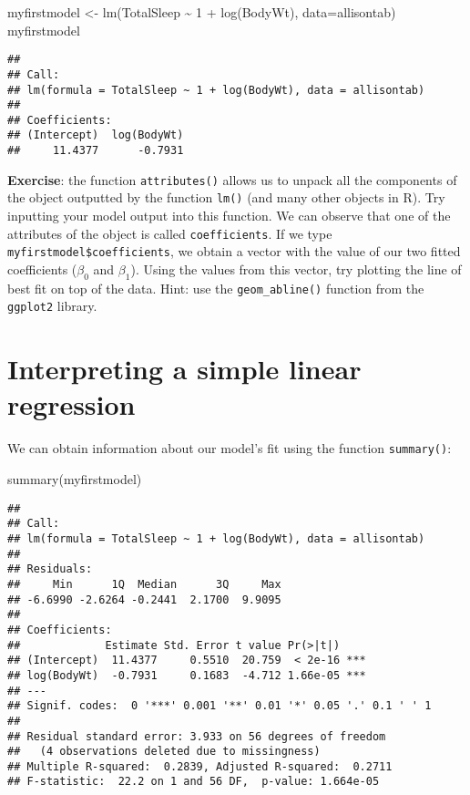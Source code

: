 \documentclass[
]{book}
\newenvironment{Shaded}{\begin{snugshade}}{\end{snugshade}}
\newcommand{\AttributeTok}[1]{\textcolor[rgb]{0.77,0.63,0.00}{#1}}
\newcommand{\DecValTok}[1]{\textcolor[rgb]{0.00,0.00,0.81}{#1}}
\newcommand{\FunctionTok}[1]{\textcolor[rgb]{0.00,0.00,0.00}{#1}}
\newcommand{\NormalTok}[1]{#1}
\newcommand{\OtherTok}[1]{\textcolor[rgb]{0.56,0.35,0.01}{#1}}
\newcommand{\SpecialCharTok}[1]{\textcolor[rgb]{0.00,0.00,0.00}{#1}}
\begin{document}
\begin{Shaded}
\begin{Highlighting}[]
\NormalTok{myfirstmodel }\OtherTok{\textless{}{-}} \FunctionTok{lm}\NormalTok{(TotalSleep }\SpecialCharTok{\textasciitilde{}} \DecValTok{1} \SpecialCharTok{+} \FunctionTok{log}\NormalTok{(BodyWt), }\AttributeTok{data=}\NormalTok{allisontab)  }
\NormalTok{myfirstmodel}
\end{Highlighting}
\end{Shaded}

\begin{verbatim}
## 
## Call:
## lm(formula = TotalSleep ~ 1 + log(BodyWt), data = allisontab)
## 
## Coefficients:
## (Intercept)  log(BodyWt)  
##     11.4377      -0.7931
\end{verbatim}

\textbf{Exercise}: the function \texttt{attributes()} allows us to unpack all the components of the object outputted by the function \texttt{lm()} (and many other objects in R). Try inputting your model output into this function. We can observe that one of the attributes of the object is called \texttt{coefficients}. If we type \texttt{myfirstmodel\$coefficients}, we obtain a vector with the value of our two fitted coefficients (\(\beta_0\) and \(\beta_1\)). Using the values from this vector, try plotting the line of best fit on top of the data. Hint: use the \texttt{geom\_abline()} function from the \texttt{ggplot2} library.

\hypertarget{interpreting-a-simple-linear-regression-1}{%
\section{Interpreting a simple linear regression}\label{interpreting-a-simple-linear-regression-1}}

We can obtain information about our model's fit using the function \texttt{summary()}:

\begin{Shaded}
\begin{Highlighting}[]
\FunctionTok{summary}\NormalTok{(myfirstmodel)}
\end{Highlighting}
\end{Shaded}

\begin{verbatim}
## 
## Call:
## lm(formula = TotalSleep ~ 1 + log(BodyWt), data = allisontab)
## 
## Residuals:
##     Min      1Q  Median      3Q     Max 
## -6.6990 -2.6264 -0.2441  2.1700  9.9095 
## 
## Coefficients:
##             Estimate Std. Error t value Pr(>|t|)    
## (Intercept)  11.4377     0.5510  20.759  < 2e-16 ***
## log(BodyWt)  -0.7931     0.1683  -4.712 1.66e-05 ***
## ---
## Signif. codes:  0 '***' 0.001 '**' 0.01 '*' 0.05 '.' 0.1 ' ' 1
## 
## Residual standard error: 3.933 on 56 degrees of freedom
##   (4 observations deleted due to missingness)
## Multiple R-squared:  0.2839, Adjusted R-squared:  0.2711 
## F-statistic:  22.2 on 1 and 56 DF,  p-value: 1.664e-05
\end{verbatim}
\end{document}
